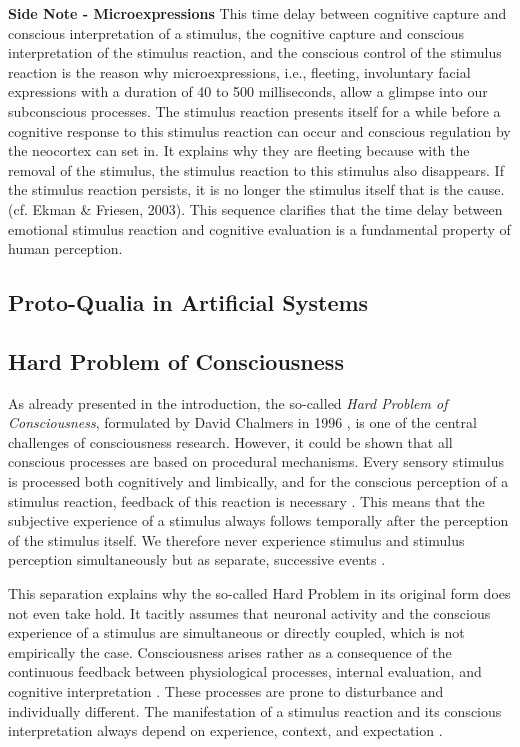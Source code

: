 \textbf{Side Note - Microexpressions}
This time delay between cognitive capture and conscious interpretation of a stimulus, the cognitive capture and conscious interpretation of the stimulus reaction, and the conscious control of the stimulus reaction is the reason why microexpressions, i.e., fleeting, involuntary facial expressions with a duration of 40 to 500 milliseconds, allow a glimpse into our subconscious processes. The stimulus reaction presents itself for a while before a cognitive response to this stimulus reaction can occur and conscious regulation by the neocortex can set in. It explains why they are fleeting because with the removal of the stimulus, the stimulus reaction to this stimulus also disappears. If the stimulus reaction persists, it is no longer the stimulus itself that is the cause. (cf. Ekman & Friesen, 2003). This sequence clarifies that the time delay between emotional stimulus reaction and cognitive evaluation is a fundamental property of human perception.



\subsection*{Proto-Qualia in Artificial Systems}

\subsection*{Hard Problem of Consciousness}

As already presented in the introduction, the so-called \emph{Hard Problem of Consciousness}, formulated by David Chalmers in 1996 \cite{Chalmers1996}, is one of the central challenges of consciousness research. However, it could be shown that all conscious processes are based on procedural mechanisms. Every sensory stimulus is processed both cognitively and limbically, and for the conscious perception of a stimulus reaction, feedback of this reaction is necessary \cite{Damasio1999, Craig2009}. This means that the subjective experience of a stimulus always follows temporally after the perception of the stimulus itself. We therefore never experience stimulus and stimulus perception simultaneously but as separate, successive events \cite{Libet1993, LeDoux1996}.

This separation explains why the so-called Hard Problem in its original form does not even take hold. It tacitly assumes that neuronal activity and the conscious experience of a stimulus are simultaneous or directly coupled, which is not empirically the case. Consciousness arises rather as a consequence of the continuous feedback between physiological processes, internal evaluation, and cognitive interpretation \cite{Damasio1994, Craig2002}. These processes are prone to disturbance and individually different. The manifestation of a stimulus reaction and its conscious interpretation always depend on experience, context, and expectation \cite{Barrett2017}.

